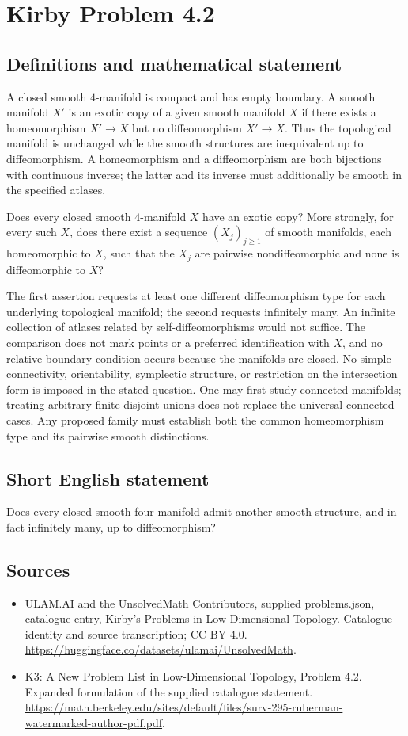 \documentclass[11pt,a4paper]{article}
\begin{document}
\section*{Kirby Problem 4.2}\label{statement}

\subsection{Definitions and mathematical statement}
A closed smooth $4$-manifold is compact and has empty boundary.
A smooth manifold $X'$ is an exotic copy of a given smooth manifold
$X$ if there exists a homeomorphism $X'\to X$ but no diffeomorphism
$X'\to X$. Thus the topological manifold is unchanged while the smooth
structures are inequivalent up to diffeomorphism. A homeomorphism and
a diffeomorphism are both bijections with continuous inverse; the latter
and its inverse must additionally be smooth in the specified atlases.

Does every closed smooth $4$-manifold $X$ have an exotic copy? More
strongly, for every such $X$, does there exist a sequence
$(X_j)_{j\ge1}$ of smooth manifolds, each homeomorphic to $X$, such
that the $X_j$ are pairwise nondiffeomorphic and none is diffeomorphic
to $X$?

The first assertion requests at least one different diffeomorphism
type for each underlying topological manifold; the second requests
infinitely many. An infinite collection of atlases related by
self-diffeomorphisms would not suffice. The comparison does not mark
points or a preferred identification with $X$, and no relative-boundary
condition occurs because the manifolds are closed.
No simple-connectivity, orientability, symplectic structure, or restriction
on the intersection form is imposed in the stated question. One may
first study connected manifolds; treating arbitrary finite disjoint
unions does not replace the universal connected cases. Any proposed
family must establish both the common homeomorphism type and its
pairwise smooth distinctions.
\subsection{Short English statement}
Does every closed smooth four-manifold admit another smooth structure, and in fact infinitely many, up to diffeomorphism?
\subsection{Sources}
\begin{itemize}
\item[S1] ULAM.AI and the UnsolvedMath Contributors, supplied problems.json, catalogue entry, Kirby's Problems in Low-Dimensional Topology. Catalogue identity and source transcription; CC BY 4.0.
\url{https://huggingface.co/datasets/ulamai/UnsolvedMath}.
\item[S2] K3: A New Problem List in Low-Dimensional Topology, Problem 4.2. Expanded formulation of the supplied catalogue statement.
\url{https://math.berkeley.edu/sites/default/files/surv-295-ruberman-watermarked-author-pdf.pdf}.
\end{itemize}
\end{document}
